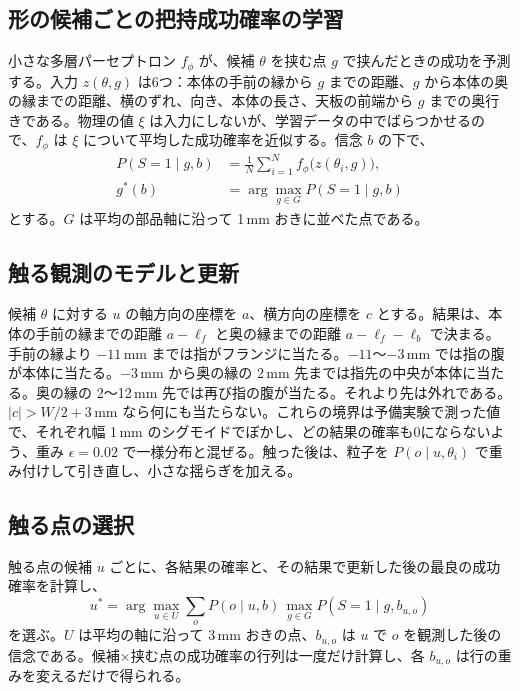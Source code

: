 \documentclass[conference]{IEEEtran}
\begin{document}
\subsection{形の候補ごとの把持成功確率の学習}\label{sec:pred}
小さな多層パーセプトロン $f_\phi$ が、候補 $\theta$ を挟む点 $g$ で挟んだときの成功を予測する。入力 $z(\theta,g)$ は6つ：本体の手前の縁から $g$ までの距離、$g$ から本体の奥の縁までの距離、横のずれ、向き、本体の長さ、天板の前端から $g$ までの奥行きである。物理の値 $\xi$ は入力にしないが、学習データの中でばらつかせるので、$f_\phi$ は $\xi$ について平均した成功確率を近似する。信念 $b$ の下で、
\begin{align}
P(S{=}1\mid g,b)&=\frac{1}{N}\sum_{i=1}^{N} f_\phi\bigl(z(\theta_i,g)\bigr),\\
g^*(b)&=\arg\max_{g\in G} P(S{=}1\mid g,b)
\end{align}
とする。$G$ は平均の部品軸に沿って 1\,mm おきに並べた点である。

\subsection{触る観測のモデルと更新}\label{sec:obs}
候補 $\theta$ に対する $u$ の軸方向の座標を $a$、横方向の座標を $c$ とする。結果は、本体の手前の縁までの距離 $a-\ell_f$ と奥の縁までの距離 $a-\ell_f-\ell_b$ で決まる。手前の縁より $-11$\,mm までは指がフランジに当たる。$-11$〜$-3$\,mm では指の腹が本体に当たる。$-3$\,mm から奥の縁の 2\,mm 先までは指先の中央が本体に当たる。奥の縁の 2〜12\,mm 先では再び指の腹が当たる。それより先は外れである。$|c|>W/2+3$\,mm なら何にも当たらない。これらの境界は予備実験で測った値で、それぞれ幅 1\,mm のシグモイドでぼかし、どの結果の確率も0にならないよう、重み $\epsilon=0.02$ で一様分布と混ぜる。触った後は、粒子を $P(o\mid u,\theta_i)$ で重み付けして引き直し、小さな揺らぎを加える。

\subsection{触る点の選択}\label{sec:touchsel}
触る点の候補 $u$ ごとに、各結果の確率と、その結果で更新した後の最良の成功確率を計算し、
\begin{equation}
u^*=\arg\max_{u\in U}\sum_{o} P(o\mid u,b)\,\max_{g\in G} P(S{=}1\mid g,b_{u,o})
\label{eq:voi}
\end{equation}
を選ぶ。$U$ は平均の軸に沿って 3\,mm おきの点、$b_{u,o}$ は $u$ で $o$ を観測した後の信念である。候補×挟む点の成功確率の行列は一度だけ計算し、各 $b_{u,o}$ は行の重みを変えるだけで得られる。
\end{document}
